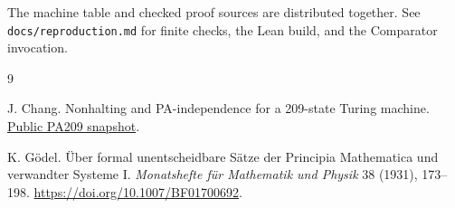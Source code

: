 \documentclass[11pt,letterpaper]{article}
\newcommand{\file}[1]{\texttt{\nolinkurl{#1}}}
\begin{document}
The machine table and checked proof sources are distributed together.
See \file{docs/reproduction.md} for finite checks, the Lean build,
and the Comparator invocation.

\begin{thebibliography}{9}

J. Chang.
Nonhalting and PA-independence for a 209-state Turing machine.
\href{https://github.com/jamesyc/BusyBeaver/tree/69d98241a721ead20b4f0b17df9062950b40fbfe}{Public PA209 snapshot}.

K. G\"odel.
\"Uber formal unentscheidbare S\"atze der Principia Mathematica und
verwandter Systeme I.
\emph{Monatshefte f\"ur Mathematik und Physik} 38 (1931), 173--198.
\url{https://doi.org/10.1007/BF01700692}.

\end{thebibliography}
\end{document}
